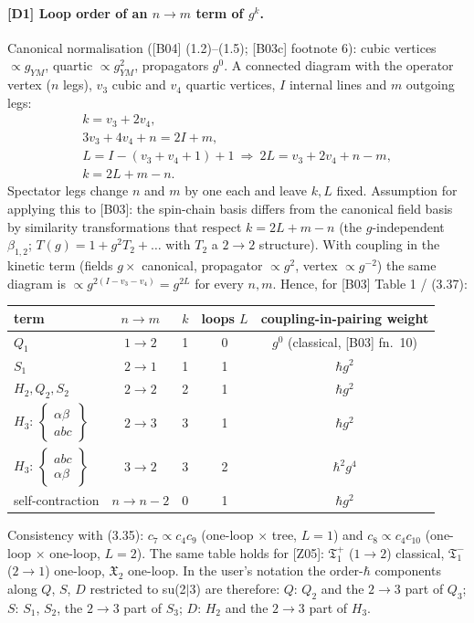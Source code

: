 \documentclass[10pt]{article}
\newcommand{\bs}[2]{\left\{\begin{smallmatrix}#1\\ #2\end{smallmatrix}\right\}}
\begin{document}
\paragraph{[D1] Loop order of an $n\to m$ term of $g^k$.} Canonical normalisation ([B04] (1.2)--(1.5); [B03c] footnote 6): cubic vertices $\propto g_{YM}$, quartic $\propto g_{YM}^2$, propagators $g^0$. A connected diagram with the operator vertex ($n$ legs), $v_3$ cubic and $v_4$ quartic vertices, $I$ internal lines and $m$ outgoing legs:
\begin{gather*}
k=v_3+2v_4,\\ 3v_3+4v_4+n=2I+m,\\ L=I-(v_3+v_4+1)+1\ \Longrightarrow\ 2L=v_3+2v_4+n-m,\\ k=2L+m-n.
\end{gather*}
Spectator legs change $n$ and $m$ by one each and leave $k,L$ fixed. Assumption for applying this to [B03]: the spin-chain basis differs from the canonical field basis by similarity transformations that respect $k=2L+m-n$ (the $g$-independent $\beta_{1,2}$; $T(g)=1+g^2T_2+\dots$ with $T_2$ a $2\to2$ structure). With coupling in the kinetic term (fields $g\times$ canonical, propagator $\propto g^2$, vertex $\propto g^{-2}$) the same diagram is $\propto g^{2(I-v_3-v_4)}=g^{2L}$ for every $n,m$. Hence, for [B03] Table 1 / (3.37):
\begin{center}
\begin{tabular}{l|c|c|c|c}
term & $n\to m$ & $k$ & loops $L$ & coupling-in-pairing weight\\ \hline
$Q_1$ & $1\to2$ & 1 & 0 & $g^0$ (classical, [B03] fn.\ 10)\\
$S_1$ & $2\to1$ & 1 & 1 & $\hbar g^2$\\
$H_2,Q_2,S_2$ & $2\to2$ & 2 & 1 & $\hbar g^2$\\
$H_3$: $\bs{\alpha\beta}{abc}$ & $2\to3$ & 3 & 1 & $\hbar g^2$\\
$H_3$: $\bs{abc}{\alpha\beta}$ & $3\to2$ & 3 & 2 & $\hbar^2g^4$\\
self-contraction & $n\to n-2$ & 0 & 1 & $\hbar g^2$
\end{tabular}
\end{center}
Consistency with (3.35): $c_7\propto c_4c_9$ (one-loop $\times$ tree, $L=1$) and $c_8\propto c_4c_{10}$ (one-loop $\times$ one-loop, $L=2$). The same table holds for [Z05]: $\mathfrak T^+_1$ ($1\to2$) classical, $\mathfrak T^-_1$ ($2\to1$) one-loop, $\mathfrak X_2$ one-loop. In the user's notation the order-$\hbar$ components along $Q$, $S$, $D$ restricted to su(2$|$3) are therefore: $Q$: $Q_2$ and the $2\to3$ part of $Q_3$; $S$: $S_1$, $S_2$, the $2\to3$ part of $S_3$; $D$: $H_2$ and the $2\to3$ part of $H_3$.
\end{document}
